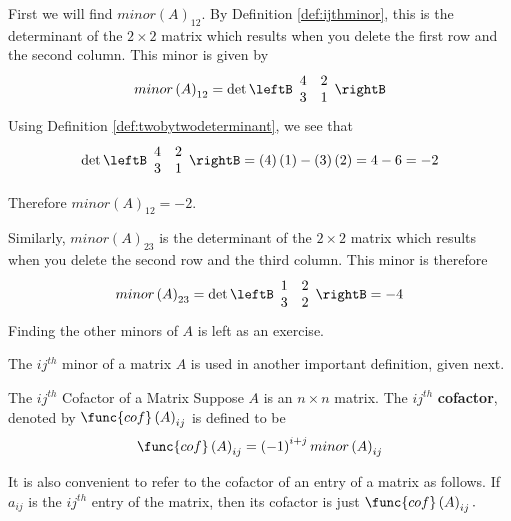 \begin{solution} First we will find $minor\left( A\right) _{12}$. By Definition
\ref{def:ijthminor}, this is the determinant of the $2\times 2$ matrix
which results when you delete the first row and the second column. This
minor is given by
\begin{equation*}
minor \left(A\right)_{12}
=
\det \leftB
\begin{array}{rr}
4 & 2 \\
3 & 1
\end{array}
\rightB
\end{equation*}
Using Definition \ref{def:twobytwodeterminant}, we see that 
\begin{equation*}
\det \leftB
\begin{array}{rr}
4 & 2 \\
3 & 1
\end{array}
\rightB = \left(4\right)\left(1\right) - \left(3\right)\left(2\right) = 4 - 6 = -2
\end{equation*}

Therefore $minor \left(A\right)_{12} = -2$. 

Similarly, $minor\left(A\right)_{23}$ is the determinant of the $2\times 2$ matrix
which results when you delete the second row and the third column. This
minor is therefore
\begin{equation*}
minor \left(A\right)_{23} 
=
\det \leftB
\begin{array}{rr}
1 & 2 \\
3 & 2
\end{array}
\rightB = -4
\end{equation*}
Finding the other minors of $A$ is left as an exercise. 
\end{solution}

The $ij^{th}$ minor of a matrix $A$ is used in another important definition, given next.

\begin{definition}{The $ij^{th}$ Cofactor of a Matrix}\label{def:ijthcofactor}
Suppose $A$ is an $n\times n$ matrix. The $ij^{th}$ \textbf{cofactor}, denoted by $\func{cof}\left( A\right) _{ij}$ is
defined to be 
\begin{equation*}
\func{cof}\left( A\right) _{ij} = \left( -1\right) ^{i+j} minor\left(A\right)_{ij} 
\end{equation*}
\end{definition}

It is also convenient to refer to the
cofactor of an entry of a matrix as follows. If $a_{ij}$ is the $ij^{th}$ entry of the
matrix, then its cofactor is just $\func{cof}\left( A\right) _{ij}.$

